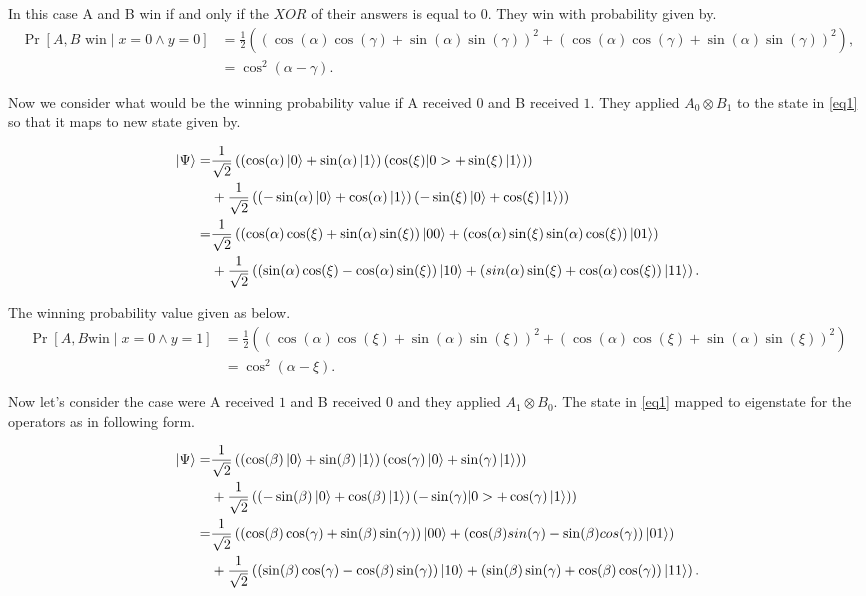 In this case A and B win if and only if the $XOR$ of their answers is equal to $0$. They win with probability given by.
\begin{align}
 \Pr[A,B \text{ win}  \mid  x=0 \wedge y=0]&=\frac{1}{2}\left(\left(\cos(\alpha) \cos(\gamma)+\sin(\alpha)\sin(\gamma)\right)^2   +\left(\cos(\alpha) \cos(\gamma)+\sin(\alpha)\sin(\gamma)\right)^2  \right)\nonumber,\\ 
&=\cos^2(\alpha-\gamma).\label{eq2}
\end{align}

Now we consider what would be the winning probability value if A received $0$ and B received $1$. They applied $A_0\otimes B_1$ to the state in \ref{eq1} so that it maps  to new state given by.

\begin{align*}
\ket{\Psi} = &\frac{1}{\sqrt{2}}\left( \left(\cos(\alpha)\ket{0}+\sin(\alpha)\ket{1} \right) \left(\cos(\xi)|0>+\sin(\xi)\ket{1} \right) \right)  \\  
&+\frac{1}{\sqrt{2}} \left( \left(-\sin(\alpha)\ket{0}+\cos(\alpha)\ket{1} \right) \left(-\sin(\xi)\ket{0}+\cos(\xi)\ket{1} \right) \right)\\
=& \frac{1}{\sqrt{2}}\left(\left(\cos(\alpha) \cos(\xi)+\sin(\alpha) \sin(\xi)\right)\ket{00}+\left( \cos(\alpha)  \sin(\xi)\sin(\alpha)  \cos(\xi)\right)\ket{01}\right)\\
&+\frac{1}{\sqrt{2}}\left( \left( \sin(\alpha)  \cos(\xi)-\cos(\alpha) \sin(\xi)\right)\ket{10}+\left(sin(\alpha)  \sin(\xi)+\cos(\alpha)  \cos(\xi)\right)\ket{11}\right).
\end{align*}

The winning probability value given as below.
\begin{align} 
\Pr[A,B \text{win}  \mid  x=0 \wedge y=1]&=\frac{1}{2}\left(\left(\cos(\alpha)  \cos(\xi)+\sin(\alpha)\sin(\xi)\right)^2  +\left(\cos(\alpha)  \cos(\xi)+\sin(\alpha)\sin(\xi)\right)^2  \right)\nonumber\\ 
&=\cos^2(\alpha-\xi).\label{eq3}
\end{align}

Now let's consider  the case were  A received $1$ and B received $0$  and they applied $A_1\otimes B_0$. The state in \ref{eq1} mapped to eigenstate for the operators as in following form.


\begin{align*}
\ket{\Psi }=& \frac{1}{\sqrt{2}}\left( \left(\cos(\beta)\ket{0}+\sin(\beta)\ket{1} \right) \left(\cos(\gamma)\ket{0}+\sin(\gamma)\ket{1} \right) \right)  \\  
&+  \frac{1}{\sqrt{2}} \left( \left(-\sin(\beta)\ket{0}+\cos(\beta)\ket{1} \right) \left(-\sin(\gamma)|0>+\cos(\gamma)\ket{1} \right) \right)\\
=& \frac{1}{\sqrt{2}}\left(\left(\cos(\beta) \cos(\gamma)+\sin(\beta) \sin(\gamma)\right)\ket{00}+\left( \cos(\beta)  sin(\gamma)-\sin(\beta)  cos(\gamma)\right)\ket{01}\right)\\
&+\frac{1}{\sqrt{2}}\left( \left( \sin(\beta)  \cos(\gamma)-\cos(\beta) \sin(\gamma)\right)\ket{10}+\left(\sin(\beta) \sin(\gamma)+\cos(\beta)  \cos(\gamma)\right)\ket{11}\right).
\end{align*}

